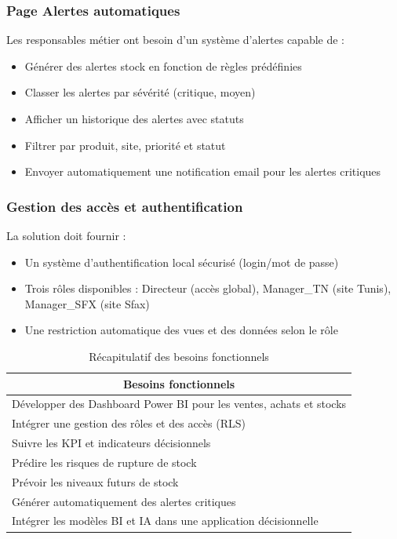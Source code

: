 \subsubsection{Page Alertes automatiques}
Les responsables métier ont besoin d'un système d'alertes capable de :
\begin{itemize}
    \item Générer des alertes stock en fonction de règles prédéfinies
    \item Classer les alertes par sévérité (critique, moyen)
    \item Afficher un historique des alertes avec statuts
    \item Filtrer par produit, site, priorité et statut
    \item Envoyer automatiquement une notification email pour les alertes critiques
\end{itemize}
\subsubsection{Gestion des accès et authentification}
La solution doit fournir :
\begin{itemize}
    \item Un système d'authentification local sécurisé (login/mot de passe)
    \item Trois rôles disponibles : Directeur (accès global), Manager\_TN (site Tunis), Manager\_SFX (site Sfax)
    \item Une restriction automatique des vues et des données selon le rôle
\end{itemize}


\begin{table}[H]
\centering
\caption{Récapitulatif des besoins fonctionnels}
\renewcommand{\arraystretch}{1.1}
\label{tab:ch2:besoins_fonctionnels}
\small
\begin{tabular}{|p{12cm}|}
\hline
\multicolumn{1}{|c|}{\textbf{Besoins fonctionnels}} \\
\hline
Développer des Dashboard Power BI pour les ventes, achats et stocks \\
\hline
Intégrer une gestion des rôles et des accès (RLS) \\
\hline
Suivre les KPI et indicateurs décisionnels \\
\hline
Prédire les risques de rupture de stock \\
\hline
Prévoir les niveaux futurs de stock \\
\hline
Générer automatiquement des alertes critiques \\
\hline
Intégrer les modèles BI et IA dans une application décisionnelle \\
\hline
\end{tabular}
\end{table}

